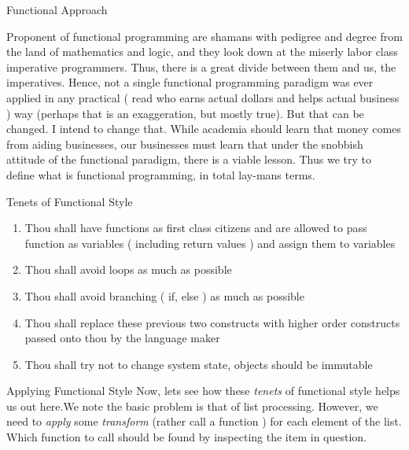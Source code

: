 \begin{section}{Functional Approach}\label{functional}

Proponent of functional programming are shamans with pedigree and degree from the land of mathematics and logic, 
and they look down at the miserly labor class imperative programmers. Thus, there is a great divide between them and us, the imperatives. Hence, not a single functional programming paradigm was ever applied in any practical ( read who earns actual dollars and helps actual business ) way (perhaps that is an exaggeration, but mostly true). 
But that can be changed. I intend to change that. While academia should learn that money comes from aiding businesses, our businesses must learn that under the snobbish attitude of the functional paradigm, there is a viable lesson. Thus we try to define what is functional programming, in total lay-mans terms.


\begin{subsection}{Tenets of Functional Style}\label{functional-tenet}

\begin{enumerate}
\item{Thou shall have functions as first class citizens and are allowed to pass function as variables 
   ( including return values ) and assign them to variables }
\item{Thou shall avoid loops as much as possible}
\item{Thou shall avoid branching ( if, else ) as much as possible}
\item{Thou shall replace these previous two constructs with higher order constructs passed onto thou by the language maker}
\item{Thou shall try not to change system state, objects should be immutable}

\end{enumerate}

\end{subsection}


\begin{subsection}{Applying Functional Style}\label{apply-functional}
Now, lets see how these \emph{tenets} of functional style helps us out here.We note the basic problem is that of list processing. 
However, we need to \emph{apply} some \emph{transform} (rather call a function ) for each element of the list.
Which function to call should be found by inspecting the item in question.


\end{subsection}
\end{section}
